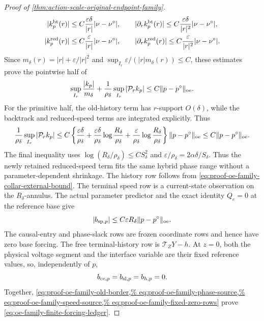 \begin{proof}[Proof of
\cref{thm:action-scale-original-endpoint-family}]
\begin{align}
 |k_p^{\rm bt}(r)|
 &\le C\frac{\varepsilon\delta}{|r|}
       |\nu-\nu^\circ|,\qquad
 |\partial_rk_p^{\rm bt}(r)|
 \le C\frac{\varepsilon\delta}{|r|^2}
       |\nu-\nu^\circ|,\notag\\
 |k_p^{\rm red}(r)|
 &\le C\frac{\varepsilon}{|r|}|\nu-\nu^\circ|,\qquad
 |\partial_rk_p^{\rm red}(r)|
 \le C\frac{\varepsilon}{|r|^2}|\nu-\nu^\circ|.
                                                        \label{eq:proof-oe-family-phase-piece-bounds}
\end{align}
Since \(m_\delta(r)=|r|+\varepsilon/|r|^2\) and
\(\sup_{I_r}\varepsilon/(|r|m_\delta(r))\le C\), these estimates prove
the pointwise half of
\begin{equation}
 \sup_{I_r}\frac{|k_p|}{m_\delta}
 +\frac1{\rho_\delta}\sup_{I_r}|\mathcal P_rk_p|
 \le C\|p-p^\circ\|_{\rm oe}.                  \label{eq:proof-oe-family-phase-source}
\end{equation}
For the primitive half, the old-history term has \(r\)-support
\(O(\delta)\), while the backtrack and reduced-speed terms are integrated
explicitly.  Thus
\begin{equation}
 \frac1{\rho_\delta}\sup_{I_r}|\mathcal P_rk_p|
 \le C\left\{
    \frac{\varepsilon\delta}{\rho_\delta}
   +\frac{\varepsilon\delta}{\rho_\delta}
        \log\frac{R_\delta}{\rho_\delta}
   +\frac{\varepsilon}{\rho_\delta}
        \log\frac{R_\delta}{\rho_\delta}\right\}
       \|p-p^\circ\|_{\rm oe}
 \le C\|p-p^\circ\|_{\rm oe}.                 \label{eq:proof-oe-family-phase-prefix-direct}
\end{equation}
The final inequality uses
\(\log(R_\delta/\rho_\delta)\le CS_\delta^2\) and
\(\varepsilon/\rho_\delta=2\alpha\delta/S_\delta\).  Thus the newly
retained reduced-speed term fits the same hybrid phase range without a
parameter-dependent shrinkage.
The history row follows from
\cref{eq:proof-oe-family-collar-external-bound}.  The terminal speed row is
a current-state observation on the \(R_\delta\)-annulus.  The actual
parameter predictor and the exact identity
\(Q_e=0\) at the reference base give
\begin{equation}
 |b_{{\rm sp},p}|
 \le C\varepsilon R_\delta\|p-p^\circ\|_{\rm oe}.           \label{eq:proof-oe-family-speed-source}
\end{equation}
The causal-entry and phase-slack rows are frozen coordinate rows and hence
have zero base forcing.  The free terminal-history row is
\(\mathcal T_ZY-h\).  At \(z=0\), both the physical voltage segment and
the interface variable are their fixed reference values, so, independently
of \(p\),
\begin{equation}
 b_{{\rm ce},p}=b_{{\rm sl},p}=b_{h,p}=0.       \label{eq:proof-oe-family-fixed-zero-rows}
\end{equation}
Together,
\cref{eq:proof-oe-family-old-border,%
eq:proof-oe-family-phase-source,%
eq:proof-oe-family-speed-source,%
eq:proof-oe-family-fixed-zero-rows}
prove \cref{eq:oe-family-finite-forcing-ledger}.


\end{proof}
